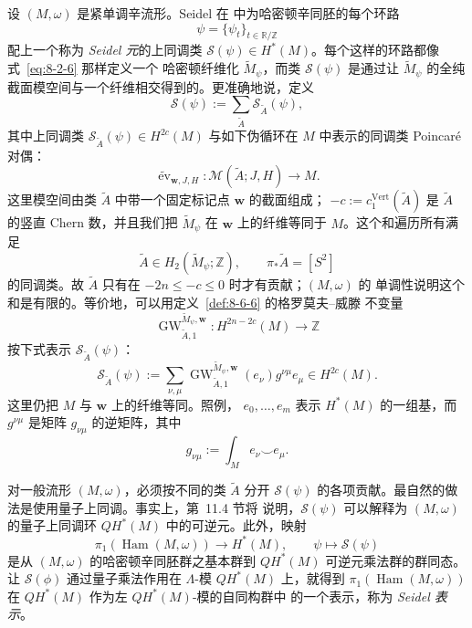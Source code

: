 \begin{example}\label{ex:8-6-8}
设 $(M,\omega)$ 是紧单调辛流形。Seidel 在  中为哈密顿辛同胚的每个环路
\[
  \psi=\{\psi_t\}_{t\in\mathbb R/\mathbb Z}
\]
配上一个称为 \emph{Seidel 元}的上同调类
$\mathcal S(\psi)\in H^*(M)$。每个这样的环路都像式~\eqref{eq:8-2-6} 那样定义一个
哈密顿纤维化 $\widetilde M_\psi$，而类 $\mathcal S(\psi)$ 是通过让
$\widetilde M_\psi$ 的全纯截面模空间与一个纤维相交得到的。更准确地说，定义
\[
  \mathcal S(\psi):=\sum_{\widetilde A}\mathcal S_{\widetilde A}(\psi),
\]
其中上同调类
$\mathcal S_{\widetilde A}(\psi)\in H^{2c}(M)$ 与如下伪循环在 $M$ 中表示的同调类
Poincaré 对偶：
\[
  \widetilde{\operatorname{ev}}_{\mathbf w,J,H}:
  \mathcal M(\widetilde A;J,H)\longrightarrow M.
\]
这里模空间由类 $\widetilde A$ 中带一个固定标记点 $\mathbf w$ 的截面组成；
$-c:=c_1^{\mathrm{Vert}}(\widetilde A)$ 是 $\widetilde A$ 的竖直 Chern 数，并且我们把
$\widetilde M_\psi$ 在 $\mathbf w$ 上的纤维等同于 $M$。这个和遍历所有满足
\[
  \widetilde A\in H_2(\widetilde M_\psi;\mathbb Z),
  \qquad \pi_*\widetilde A=[S^2]
\]
的同调类。故 $\widetilde A$ 只有在 $-2n\le-c\le0$ 时才有贡献；$(M,\omega)$ 的
单调性说明这个和是有限的。等价地，可以用定义~\ref{def:8-6-6} 的格罗莫夫--威滕
不变量
\[
  \operatorname{GW}^{\widetilde M_\psi,\mathbf w}_{\widetilde A,1}:
  H^{2n-2c}(M)\longrightarrow\mathbb Z
\]
按下式表示 $\mathcal S_{\widetilde A}(\psi)$：
\begin{equation}\label{eq:8-6-4}
  \mathcal S_{\widetilde A}(\psi)
  :=\sum_{\nu,\mu}
  \operatorname{GW}^{\widetilde M_\psi,\mathbf w}_{\widetilde A,1}(e_\nu)
  g^{\nu\mu}e_\mu
  \in H^{2c}(M).
\end{equation}
这里仍把 $M$ 与 $\mathbf w$ 上的纤维等同。照例，
$e_0,\ldots,e_m$ 表示 $H^*(M)$ 的一组基，而 $g^{\nu\mu}$ 是矩阵
$g_{\nu\mu}$ 的逆矩阵，其中
\[
  g_{\nu\mu}:=\int_M e_\nu\smile e_\mu.
\]

对一般流形 $(M,\omega)$，必须按不同的类 $\widetilde A$ 分开
$\mathcal S(\psi)$ 的各项贡献。最自然的做法是使用量子上同调。事实上，第~11.4 节将
说明，$\mathcal S(\psi)$ 可以解释为 $(M,\omega)$ 的量子上同调环
$QH^*(M)$ 中的可逆元。此外，映射
\[
  \pi_1(\operatorname{Ham}(M,\omega))\longrightarrow H^*(M),
  \qquad \psi\longmapsto\mathcal S(\psi)
\]
是从 $(M,\omega)$ 的哈密顿辛同胚群之基本群到 $QH^*(M)$ 可逆元乘法群的群同态。让
$\mathcal S(\phi)$ 通过量子乘法作用在 $\Lambda$-模 $QH^*(M)$ 上，就得到
$\pi_1(\operatorname{Ham}(M,\omega))$ 在 $QH^*(M)$ 作为左 $QH^*(M)$-模的自同构群中
的一个表示，称为 \emph{Seidel 表示}。


\end{example}
